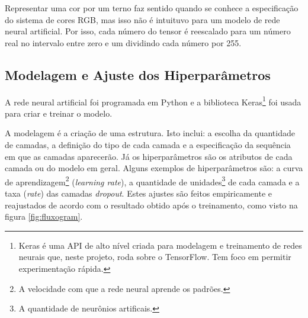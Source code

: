 Representar uma cor por um terno faz sentido quando se conhece a especificação do sistema de cores RGB, mas isso não é intuituvo para um modelo de rede neural artificial. Por isso, cada número do tensor é reescalado para um número real no intervalo entre zero e um dividindo cada número por 255.

\subsection*{Modelagem e Ajuste dos Hiperparâmetros}

A rede neural artificial foi programada em Python e a biblioteca Keras\footnote{Keras é uma API de alto nível criada para modelagem e treinamento de redes neurais que, neste projeto, roda sobre o TensorFlow. Tem foco em permitir experimentação rápida.} foi usada para criar e treinar o modelo.

A modelagem é a criação de uma estrutura. Isto inclui: a escolha da quantidade de camadas, a definição do tipo de cada camada e a especificação da sequência em que as camadas aparecerão. Já os hiperparâmetros são os atributos de cada camada ou do modelo em geral. Alguns exemplos de hiperparâmetros são: a curva de aprendizagem\footnote{A velocidade com que a rede neural aprende os padrões.} (\emph{learning rate}), a quantidade de unidades\footnote{A quantidade de neurônios artificais.} de cada camada e a taxa (\emph{rate}) das camadas \emph{dropout}. Estes ajustes são feitos empiricamente e reajustados de acordo com o resultado obtido após o treinamento, como visto na figura \ref{fig:fluxogram}.

\pagebreak

\begin{figure}[h!]
  \centering
  \begin{minipage}[t]{.47\textwidth}
    \centering
    
    \label{fig:conv_model}
  \end{minipage}%
  \hfill%
  \begin{minipage}[t]{.47\textwidth}
    \centering
    
    \label{fig:pretrained_model}
  \end{minipage}
  \end{figure}

